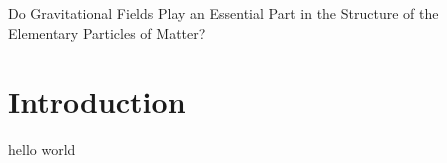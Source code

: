 \paperheader
	{Do Gravitational Fields Play an Essential Part in the Structure of the Elementary Particles of Matter?}
	{}
	{}

\section{Introduction}
hello world